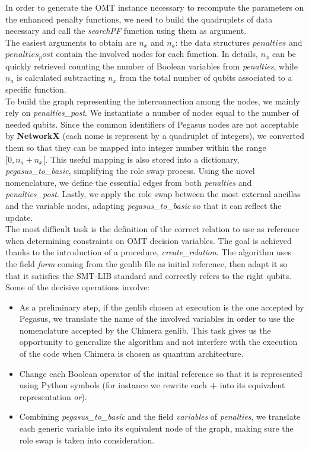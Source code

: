 In order to generate the OMT instance necessary to recompute the parameters on the enhanced penalty functions, we need to build the quadruplets of data necessary and call the \textit{searchPF} function using them as argument.\\
The easiest arguments to obtain are $n_x$ and $n_a$: the data structures $penalties$ and $penalties_post$ contain the involved nodes for each function. In details, $n_x$ can be quickly retrieved counting the number of Boolean variables from \textit{penalties}, while $n_a$ is calculated subtracting $n_x$ from the total number of qubits associated to a specific function. \\
To build the graph representing the interconnection among the nodes, we mainly rely on \textit{penalties\_post}. We instantiate a number of nodes equal to the number of needed qubits. Since the common identifiers of Pegasus nodes are not acceptable by \textbf{NetworkX} (each nome is represent by a quadruplet of integers), we converted them so that they can be mapped into integer number within the range $[0, n_a + n_x[$. This useful mapping is also stored into a dictionary, \textit{pegasus\_to\_basic}, simplifying the role swap process. Using the novel nomenclature, we define the essential edges from both \textit{penalties} and \textit{penalties\_post}. Lastly, we apply the role swap between the most external ancillas and the variable nodes, adapting \textit{pegasus\_to\_basic} so that it can reflect the update. \\
The most difficult task is the definition of the correct relation to use as reference when determining constraints on OMT decision variables. The goal is achieved thanks to the introduction of a procedure, \textit{create\_relation}. The algorithm uses the field \textit{form} coming from the genlib file as initial reference, then adapt it so that it satisfies the SMT-LIB standard and correctly refers to the right qubits. Some of the decisive operations involve:

\begin{itemize}
    \item As a preliminary step, if the genlib chosen at execution is the one accepted by Pegasus, we translate the name of the involved variables in order to use the nomenclature accepted by the Chimera genlib. This task gives us the opportunity to generalize the algorithm and not interfere with the execution of the code when Chimera is chosen as quantum architecture.
    \item Change each Boolean operator of the initial reference so that it is represented using Python symbols (for instance we rewrite each \textbf{+} into its equivalent representation \textit{or}).
    \item Combining \textit{pegasus\_to\_basic} and the field \textit{variables} of \textit{penalties}, we translate each generic variable into its equivalent node of the graph, making sure the role swap is taken into consideration.
\end{itemize}

